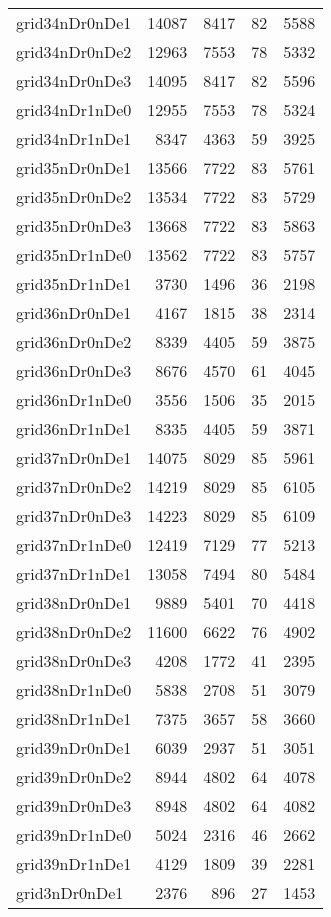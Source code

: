 \begin{longtable}{lrrrr}
grid34nDr0nDe1 & 14087 & 8417 & 82 & 5588 \\
grid34nDr0nDe2 & 12963 & 7553 & 78 & 5332 \\
grid34nDr0nDe3 & 14095 & 8417 & 82 & 5596 \\
grid34nDr1nDe0 & 12955 & 7553 & 78 & 5324 \\
grid34nDr1nDe1 & 8347 & 4363 & 59 & 3925 \\
grid35nDr0nDe1 & 13566 & 7722 & 83 & 5761 \\
grid35nDr0nDe2 & 13534 & 7722 & 83 & 5729 \\
grid35nDr0nDe3 & 13668 & 7722 & 83 & 5863 \\
grid35nDr1nDe0 & 13562 & 7722 & 83 & 5757 \\
grid35nDr1nDe1 & 3730 & 1496 & 36 & 2198 \\
grid36nDr0nDe1 & 4167 & 1815 & 38 & 2314 \\
grid36nDr0nDe2 & 8339 & 4405 & 59 & 3875 \\
grid36nDr0nDe3 & 8676 & 4570 & 61 & 4045 \\
grid36nDr1nDe0 & 3556 & 1506 & 35 & 2015 \\
grid36nDr1nDe1 & 8335 & 4405 & 59 & 3871 \\
grid37nDr0nDe1 & 14075 & 8029 & 85 & 5961 \\
grid37nDr0nDe2 & 14219 & 8029 & 85 & 6105 \\
grid37nDr0nDe3 & 14223 & 8029 & 85 & 6109 \\
grid37nDr1nDe0 & 12419 & 7129 & 77 & 5213 \\
grid37nDr1nDe1 & 13058 & 7494 & 80 & 5484 \\
grid38nDr0nDe1 & 9889 & 5401 & 70 & 4418 \\
grid38nDr0nDe2 & 11600 & 6622 & 76 & 4902 \\
grid38nDr0nDe3 & 4208 & 1772 & 41 & 2395 \\
grid38nDr1nDe0 & 5838 & 2708 & 51 & 3079 \\
grid38nDr1nDe1 & 7375 & 3657 & 58 & 3660 \\
grid39nDr0nDe1 & 6039 & 2937 & 51 & 3051 \\
grid39nDr0nDe2 & 8944 & 4802 & 64 & 4078 \\
grid39nDr0nDe3 & 8948 & 4802 & 64 & 4082 \\
grid39nDr1nDe0 & 5024 & 2316 & 46 & 2662 \\
grid39nDr1nDe1 & 4129 & 1809 & 39 & 2281 \\
grid3nDr0nDe1 & 2376 & 896 & 27 & 1453 \\

\end{longtable}
